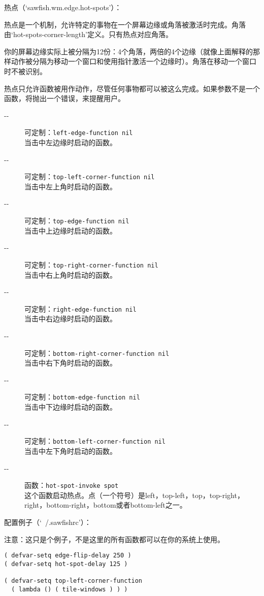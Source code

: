 \documentclass{book}
\begin{document}
\begin{CJK*}{UTF8}{gbsn}
热点（`sawfish.wm.edge.hot-spots'）：

热点是一个机制，允许特定的事物在一个屏幕边缘或角落被激活时完成。角落由`hot-spots-corner-length'定义。只有热点对应角落。

你的屏幕边缘实际上被分隔为12份：4个角落，两倍的4个边缘（就像上面解释的那样动作被分隔为移动一个窗口和使用指针激活一个边缘时）。角落在移动一个窗口时不被识别。

热点只允许函数被用作动作，尽管任何事物都可以被这么完成。如果参数不是一个函数，将抛出一个错误，来提醒用户。
\begin{description}
\item[-{}-] 可定制：\verb|left-edge-function nil|\\
当击中左边缘时启动的函数。
\item[-{}-] 可定制：\verb|top-left-corner-function nil|\\
当击中左上角时启动的函数。
\item[-{}-] 可定制：\verb|top-edge-function nil|\\
当击中上边缘时启动的函数。
\item[-{}-] 可定制：\verb|top-right-corner-function nil|\\
当击中右上角时启动的函数。
\item[-{}-] 可定制：\verb|right-edge-function nil|\\
当击中右边缘时启动的函数。
\item[-{}-] 可定制：\verb|bottom-right-corner-function nil|\\
当击中右下角时启动的函数。
\item[-{}-] 可定制：\verb|bottom-edge-function nil|\\
当击中下边缘时启动的函数。
\item[-{}-] 可定制：\verb|bottom-left-corner-function nil|\\
当击中左下角时启动的函数。
\item[-{}-] 函数：\verb|hot-spot-invoke spot|\\
这个函数启动热点。点（一个符号）是left，top-left，top，top-right，right，bottom-right，bottom或者bottom-left之一。
\end{description}

配置例子（`~/.sawfishrc'）：

注意：这只是个例子，不是这里的所有函数都可以在你的系统上使用。
\begin{verbatim}
( defvar-setq edge-flip-delay 250 )
( defvar-setq hot-spot-delay 125 )

( defvar-setq top-left-corner-function
  ( lambda () ( tile-windows ) ) )


\end{verbatim}
\end{CJK*}
\end{document}
